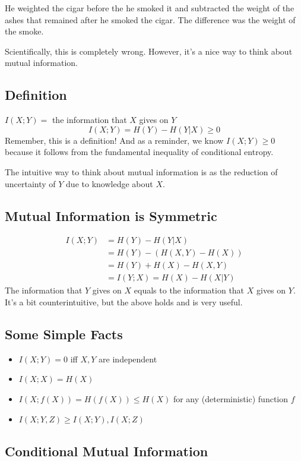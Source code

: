 \documentclass{article}
\begin{document}
He weighted the cigar before the he smoked it and subtracted the weight of the ashes that remained after he smoked the cigar. The difference was the weight of the smoke.

Scientifically, this is completely wrong. However, it's a nice way to think about mutual information.

\subsection{Definition}

$I(X;Y)=$ the information that $X$ gives on $Y$
\[
I(X;Y) = H(Y) - H(Y|X) \geq 0
\]
Remember, this is a definition! And as a reminder, we know $I(X;Y)\geq 0$ because it follows from the fundamental inequality of conditional entropy.

The intuitive way to think about mutual information is as the reduction of uncertainty of $Y$ due to knowledge about $X$.

\subsection{Mutual Information is Symmetric}

\begin{align*}
    I(X;Y) &= H(Y) - H(Y|X)\\
    &= H(Y) - \left(H(X,Y)-H(X)\right)\\
    &= H(Y) + H(X) - H(X,Y)\\
    &= I(Y;X) = H(X) - H(X|Y)
\end{align*}
The information that $Y$ gives on $X$ equals to the information that $X$ gives on $Y$. It's a bit counterintuitive, but the above holds and is very useful.

\subsection{Some Simple Facts}

\begin{itemize}
    \item $I(X;Y)=0$ iff $X,Y$ are independent
    \item $I(X;X)=H(X)$
    \item $I(X;f(X))= H(f(X)) \leq H(X)$ for any (deterministic) function $f$
    \item $I(X;Y,Z)\geq I(X;Y),I(X;Z)$
\end{itemize}

\subsection{Conditional Mutual Information}
\end{document}
